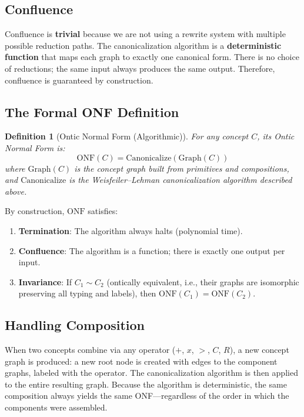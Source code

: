 \documentclass[12pt, letterpaper]{book}
\def\otimes{x}%
\def\oplus{+}%
\def\triangleright{>}%
\def\subset{C}%
\def\circlearrowleft{R}%
\newtheorem{definition}{Definition}[chapter]
\begin{document}
\subsection{Confluence}

Confluence is \textbf{trivial} because we are not using a rewrite system with multiple possible reduction paths. The canonicalization algorithm is a \textbf{deterministic function} that maps each graph to exactly one canonical form. There is no choice of reductions; the same input always produces the same output. Therefore, confluence is guaranteed by construction.

\subsection{The Formal ONF Definition}

\begin{definition}[Ontic Normal Form (Algorithmic)]\label{def:onf-alg}
For any concept $C$, its Ontic Normal Form is:
\[
\mathrm{ONF}(C) = \mathrm{Canonicalize}(\mathrm{Graph}(C))
\]
where $\mathrm{Graph}(C)$ is the concept graph built from primitives and compositions, and $\mathrm{Canonicalize}$ is the Weisfeiler--Lehman canonicalization algorithm described above.
\end{definition}

By construction, $\mathrm{ONF}$ satisfies:
\begin{enumerate}[label=(\roman*)]
    \item \textbf{Termination}: The algorithm always halts (polynomial time).
    \item \textbf{Confluence}: The algorithm is a function; there is exactly one output per input.
    \item \textbf{Invariance}: If $C_1 \sim C_2$ (ontically equivalent, i.e., their graphs are isomorphic preserving all typing and labels), then $\mathrm{ONF}(C_1) = \mathrm{ONF}(C_2)$.
\end{enumerate}

\subsection{Handling Composition}

When two concepts combine via any operator ($\oplus$, $\otimes$, $\triangleright$, $\subset$, $\circlearrowleft$), a new concept graph is produced: a new root node is created with edges to the component graphs, labeled with the operator. The canonicalization algorithm is then applied to the entire resulting graph. Because the algorithm is deterministic, the same composition always yields the same ONF---regardless of the order in which the components were assembled.
\end{document}
